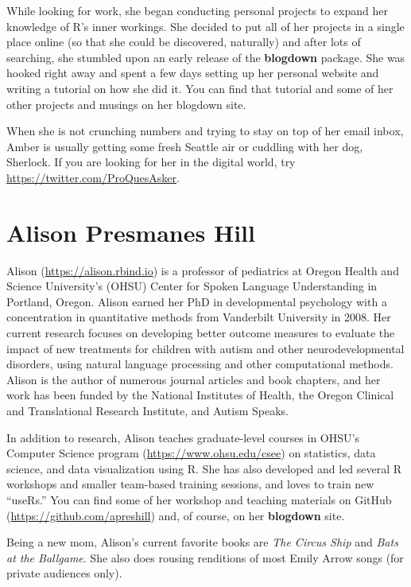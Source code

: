 \documentclass[12pt,]{krantz}
\theoremstyle{definition}
\theoremstyle{definition}
\theoremstyle{definition}
\theoremstyle{remark}
\begin{document}
While looking for work, she began conducting personal projects to expand
her knowledge of R's inner workings. She decided to put all of her
projects in a single place online (so that she could be discovered,
naturally) and after lots of searching, she stumbled upon an early
release of the \textbf{blogdown} package. She was hooked right away and
spent a few days setting up her personal website and writing a tutorial
on how she did it. You can find that tutorial and some of her other
projects and musings on her blogdown site.

When she is not crunching numbers and trying to stay on top of her email
inbox, Amber is usually getting some fresh Seattle air or cuddling with
her dog, Sherlock. If you are looking for her in the digital world, try
\url{https://twitter.com/ProQuesAsker}.

\section*{Alison Presmanes Hill}\label{alison-presmanes-hill}


Alison (\url{https://alison.rbind.io}) is a professor of pediatrics at
Oregon Health and Science University's (OHSU) Center for Spoken Language
Understanding in Portland, Oregon. Alison earned her PhD in
developmental psychology with a concentration in quantitative methods
from Vanderbilt University in 2008. Her current research focuses on
developing better outcome measures to evaluate the impact of new
treatments for children with autism and other neurodevelopmental
disorders, using natural language processing and other computational
methods. Alison is the author of numerous journal articles and book
chapters, and her work has been funded by the National Institutes of
Health, the Oregon Clinical and Translational Research Institute, and
Autism Speaks.

In addition to research, Alison teaches graduate-level courses in OHSU's
Computer Science program (\url{https://www.ohsu.edu/csee}) on
statistics, data science, and data visualization using R. She has also
developed and led several R workshops and smaller team-based training
sessions, and loves to train new ``useRs.'' You can find some of her
workshop and teaching materials on GitHub
(\url{https://github.com/apreshill}) and, of course, on her
\textbf{blogdown} site.

Being a new mom, Alison's current favorite books are \emph{The Circus
Ship} and \emph{Bats at the Ballgame}. She also does rousing renditions
of most Emily Arrow songs (for private audiences only).
\end{document}
